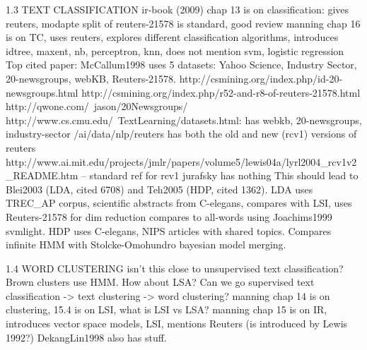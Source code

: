 \documentclass[ignorenonframetext]{beamer}
\begin{document}
1.3 TEXT CLASSIFICATION
ir-book (2009) chap 13 is on classification: gives reuters, modapte split of reuters-21578 is standard, good review
manning chap 16 is on TC, uses reuters, explores different classification algorithms, introduces idtree, maxent, nb, perceptron, knn, does not mention svm, logistic regression
Top cited paper: McCallum1998 uses 5 datasets: Yahoo Science, Industry Sector, 20-newsgroups, webKB, Reuters-21578.
http://csmining.org/index.php/id-20-newsgroups.html
http://csmining.org/index.php/r52-and-r8-of-reuters-21578.html
http://qwone.com/~jason/20Newsgroups/
http://www.cs.cmu.edu/~TextLearning/datasets.html: has webkb, 20-newsgroups, industry-sector
/ai/data/nlp/reuters has both the old and new (rcv1) versions of reuters
http://www.ai.mit.edu/projects/jmlr/papers/volume5/lewis04a/lyrl2004_rcv1v2_README.htm -- standard ref for rcv1
jurafsky has nothing
This should lead to Blei2003 (LDA, cited 6708) and Teh2005 (HDP, cited 1362).  LDA uses TREC_AP corpus, scientific abstracts from C-elegans, compares with LSI, uses Reuters-21578 for dim reduction compares to all-words using Joachims1999 svmlight.  HDP uses C-elegans, NIPS articles with shared topics.  Compares infinite HMM with Stolcke-Omohundro bayesian model merging.

1.4 WORD CLUSTERING
isn't this close to unsupervised text classification?
Brown clusters use HMM.
How about LSA?  Can we go supervised text classification -> text clustering -> word clustering?
manning chap 14 is on clustering, 15.4 is on LSI, what is LSI vs LSA?
manning chap 15 is on IR, introduces vector space models, LSI, mentions Reuters (is introduced by Lewis 1992?)
DekangLin1998 also has stuff.
\end{document}
